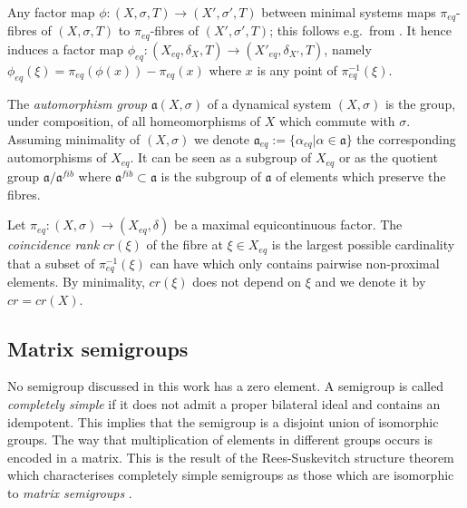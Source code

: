 \documentclass[12pt]{amsart}
\theoremstyle{definition}
\numberwithin{equation}{section}
\newcommand{\Xe}{X_{eq}}
\newcommand{\aut}{{\mathfrak a}}
\newcommand{\aute}{\aut_{eq}}
\newcommand{\pe}{\pi_{eq}}
\newcommand{\peq}{\pi_{eq}}
\begin{document}
Any factor map $\phi: (X, \sigma,T)\rightarrow (X', \sigma',T)$ between minimal systems maps $\peq$-fibres of $(X,\sigma,T)$ to $\peq$-fibres of $(X', \sigma',T)$; this follows e.g.\ from \cite[Theorem 8, Chapter 9]{Auslander1988}. It hence 
induces a factor map $\phi_{eq}: (\Xe, \delta_X,T)\rightarrow (X'_{eq}, \delta_{X'},T)$, namely  $\phi_{eq}(\xi) = \pe(\phi(x)) - \pe(x)$ where $x$ is any point of $\pe^{-1}(\xi)$. 

 The {\em automorphism group} $\aut(X,\sigma)$ of a dynamical system $(X,\sigma)$ is the group, under composition, of all homeomorphisms of $X$ which commute with $\sigma$. Assuming minimality of 
$(X,\sigma)$ we denote $\aute:=\{\alpha_{eq}|\alpha\in \aut\}$ the corresponding automorphisms of $\Xe$. It can be seen as a subgroup of $\Xe$ or as the quotient group 
$\aut/\aut^{fib}$ where   $\aut^{fib}\subset \aut$ is the subgroup of $\aut$ of elements which preserve the fibres.



Let $\pe:(X,\sigma)\to (\Xe,\delta)$ be a maximal  equicontinuous factor. 
The {\em coincidence rank} $cr(\xi)$ of the fibre at $\xi\in \Xe$ is the largest possible cardinality that a subset of $\pe^{-1}(\xi)$ can have which only contains pairwise non-proximal elements. By minimality, $cr(\xi)$ does not depend on $\xi$ and we denote it by  $cr=cr(X)$.
%



\subsection{Matrix semigroups}\label{sec:matrix-semigroups} No semigroup discussed in this work has a zero element. 
A semigroup is called \emph{completely simple} if it does not admit a proper bilateral ideal and contains an idempotent. This implies that the semigroup is a disjoint union of isomorphic groups. The way that multiplication of  elements in different groups occurs is  encoded in a matrix. This is the result of the 
Rees-Suskevitch structure theorem which characterises completely simple semigroups as those which are isomorphic to {\em matrix semigroups} \cite{howie1995fundamentals}.   
\end{document}

